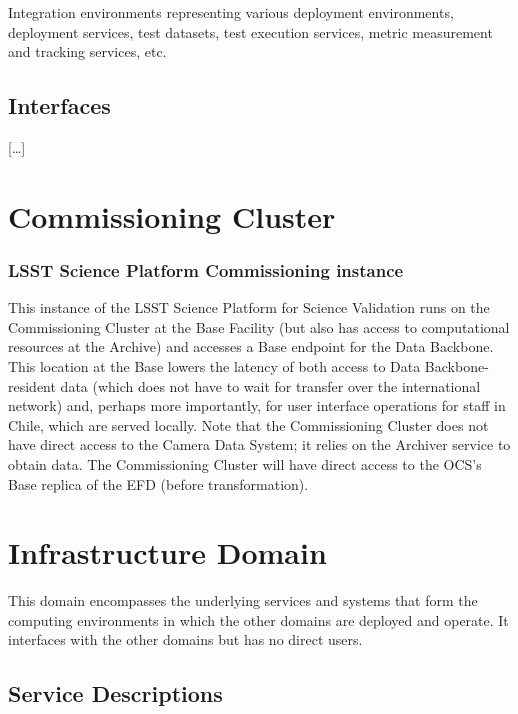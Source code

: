 \documentclass[DM,lsstdraft,toc]{lsstdoc}
\begin{document}
Integration environments representing various deployment environments,
deployment services, test datasets, test execution services, metric
measurement and tracking services, etc.

\subsection{Interfaces}\label{interfaces-4}

{[}\ldots{}{]}

\section{Commissioning Cluster}\label{commissioning-cluster}

\subsubsection{LSST Science Platform Commissioning
instance}\label{lsst-science-platform-commissioning-instance}

This instance of the LSST Science Platform for Science Validation runs
on the Commissioning Cluster at the Base Facility (but also has access
to computational resources at the Archive) and accesses a Base endpoint
for the Data Backbone. This location at the Base lowers the latency of
both access to Data Backbone-resident data (which does not have to wait
for transfer over the international network) and, perhaps more
importantly, for user interface operations for staff in Chile, which are
served locally. Note that the Commissioning Cluster does not have direct
access to the Camera Data System; it relies on the Archiver service to
obtain data. The Commissioning Cluster will have direct access to the
OCS's Base replica of the EFD (before transformation).

\section{Infrastructure Domain}\label{infrastructure-domain}

This domain encompasses the underlying services and systems that form
the computing environments in which the other domains are deployed and
operate. It interfaces with the other domains but has no direct users.

\subsection{Service Descriptions}\label{service-descriptions-5}
\end{document}
